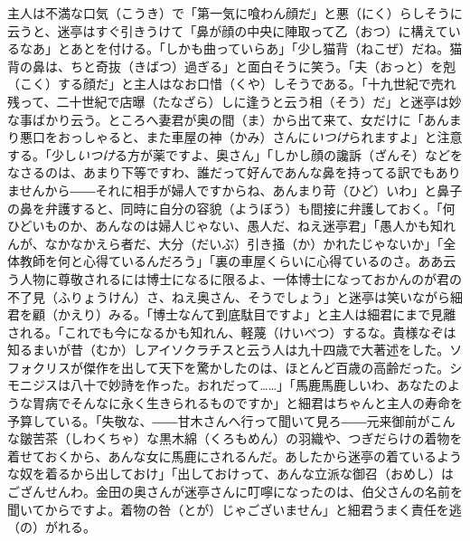 \documentclass{book}
\begin{document}
主人は不満な口気（こうき）で「第一気に喰わん顔だ」と悪（にく）らしそうに云うと、迷亭はすぐ引きうけて「鼻が顔の中央に陣取って乙（おつ）に構えているなあ」とあとを付ける。「しかも曲っていらあ」「少し猫背（ねこぜ）だね。猫背の鼻は、ちと奇抜（きばつ）過ぎる」と面白そうに笑う。「夫（おっと）を剋（こく）する顔だ」と主人はなお口惜（くや）しそうである。「十九世紀で売れ残って、二十世紀で店曝（たなざら）しに逢うと云う相（そう）だ」と迷亭は妙な事ばかり云う。ところへ妻君が奥の間（ま）から出て来て、女だけに「あんまり悪口をおっしゃると、また車屋の神（かみ）さんに\emph{いつけ}られますよ」と注意する。「少し\emph{いつけ}る方が薬ですよ、奥さん」「しかし顔の讒訴（ざんそ）などをなさるのは、あまり下等ですわ、誰だって好んであんな鼻を持ってる訳でもありませんから――それに相手が婦人ですからね、あんまり苛（ひど）いわ」と鼻子の鼻を弁護すると、同時に自分の容貌（ようぼう）も間接に弁護しておく。「何ひどいものか、あんなのは婦人じゃない、愚人だ、ねえ迷亭君」「愚人かも知れんが、なかなかえら者だ、大分（だいぶ）引き掻（か）かれたじゃないか」「全体教師を何と心得ているんだろう」「裏の車屋くらいに心得ているのさ。ああ云う人物に尊敬されるには博士になるに限るよ、一体博士になっておかんのが君の不了見（ふりょうけん）さ、ねえ奥さん、そうでしょう」と迷亭は笑いながら細君を顧（かえり）みる。「博士なんて到底駄目ですよ」と主人は細君にまで見離される。「これでも今になるかも知れん、軽蔑（けいべつ）するな。貴様なぞは知るまいが昔（むか）しアイソクラチスと云う人は九十四歳で大著述をした。ソフォクリスが傑作を出して天下を驚かしたのは、ほとんど百歳の高齢だった。シモニジスは八十で妙詩を作った。おれだって\ldots{}\ldots{}」「馬鹿馬鹿しいわ、あなたのような胃病でそんなに永く生きられるものですか」と細君はちゃんと主人の寿命を予算している。「失敬な、――甘木さんへ行って聞いて見ろ――元来御前がこんな皺苦茶（しわくちゃ）な黒木綿（くろもめん）の羽織や、つぎだらけの着物を着せておくから、あんな女に馬鹿にされるんだ。あしたから迷亭の着ているような奴を着るから出しておけ」「出しておけって、あんな立派な御召（おめし）はござんせんわ。金田の奥さんが迷亭さんに叮嚀になったのは、伯父さんの名前を聞いてからですよ。着物の咎（とが）じゃございません」と細君うまく責任を逃（の）がれる。
\end{document}
